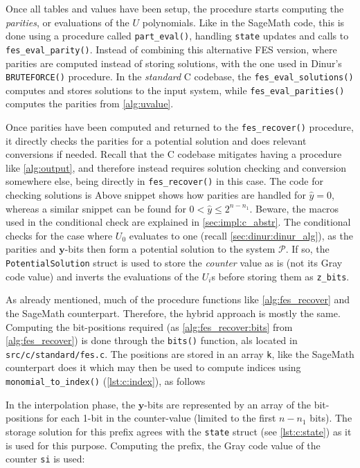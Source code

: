 Once all tables and values have been setup, the procedure starts computing the \textit{parities}, or evaluations of the $U$ polynomials. Like in the SageMath code, this is done using a procedure called \texttt{part\_eval()}, handling \texttt{state} updates and calls to \texttt{fes\_eval\_parity()}. Instead of combining this alternative FES version, where parities are computed instead of storing solutions, with the one used in Dinur's \texttt{BRUTEFORCE()} procedure. In the \textit{standard} C codebase, the \texttt{fes\_eval\_solutions()} computes and stores solutions to the input system, while \texttt{fes\_eval\_parities()} computes the parities from \cref{alg:uvalue}.

Once parities have been computed and returned to the \texttt{fes\_recover()} procedure, it directly checks the parities for a potential solution and does relevant conversions if needed. Recall that the C codebase mitigates having a procedure like \cref{alg:output}, and therefore instead requires solution checking and conversion somewhere else, being directly in \texttt{fes\_recover()} in this case. The code for checking solutions is 
Above snippet shows how parities are handled for $\hat{y} = 0$, whereas a similar snippet can be found for $0 < \hat{y} \leq 2^{n - n_1}$. Beware, the macros used in the conditional check are explained in \cref{sec:impl:c_abstr}. The conditional checks for the case where $U_0$ evaluates to one (recall \cref{sec:dinur:dinur_alg}), as the parities and $\mathbf{y}$-bits then form a potential solution to the system $\mathcal{P}$. If so, the \texttt{PotentialSolution} struct is used to store the \textit{counter} value as is (not its Gray code value) and inverts the evaluations of the $U_i$s before storing them as \texttt{z\_bits}.

As already mentioned, much of the procedure functions like \cref{alg:fes_recover} and the SageMath counterpart. Therefore, the hybrid approach is mostly the same. Computing the bit-positions required (as \cref{alg:fes_recover:bits} from \cref{alg:fes_recover}) is done through the \texttt{bits()} function, als located in \texttt{src/c/standard/fes.c}. The positions are stored in an array \texttt{k}, like the SageMath counterpart does it 
which may then be used to compute indices using \texttt{monomial\_to\_index()} (\cref{lst:c:index}), as follows

In the interpolation phase, the $\mathbf{y}$-bits are represented by an array of the bit-positions for each 1-bit in the counter-value (limited to the first $n - n_1$ bits). The storage solution for this prefix agrees with the \texttt{state} struct (see \cref{lst:c:state}) as it is used for this purpose. Computing the prefix, the Gray code value of the counter \texttt{si} is used:

